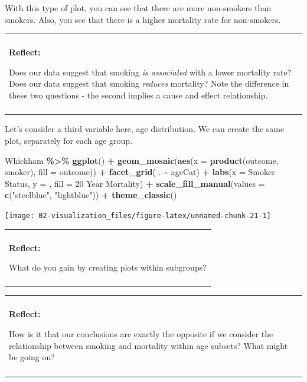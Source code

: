 \documentclass[
]{book}
\newenvironment{Shaded}{\begin{snugshade}}{\end{snugshade}}
\newcommand{\AttributeTok}[1]{\textcolor[rgb]{0.13,0.29,0.53}{#1}}
\newcommand{\FunctionTok}[1]{\textcolor[rgb]{0.13,0.29,0.53}{\textbf{#1}}}
\newcommand{\NormalTok}[1]{#1}
\newcommand{\SpecialCharTok}[1]{\textcolor[rgb]{0.81,0.36,0.00}{\textbf{#1}}}
\newcommand{\StringTok}[1]{\textcolor[rgb]{0.31,0.60,0.02}{#1}}
\newenvironment{reflect}
{
    \begin{center}
    
    \begin{tabular}{|p{0.8\textwidth}|}
    \rowcolor{LightBlue}
    \hline\\
    \rowcolor{LightBlue}
    \textbf{Reflect:}
}
{
    \\\rowcolor{LightBlue}
    \\\hline
    \end{tabular} 
    \end{center}
}
\begin{document}
With this type of plot, you can see that there are more non-smokers than smokers. Also, you see that there is a higher mortality rate for non-smokers.

\begin{reflect}
Does our data suggest that smoking \emph{is associated} with a lower
mortality rate? Does our data suggest that smoking \emph{reduces}
mortality? Note the difference in these two questions - the second
implies a cause and effect relationship.
\end{reflect}

Let's consider a third variable here, age distribution. We can create the same plot, separately for each age group.

\begin{Shaded}
\begin{Highlighting}[]
\NormalTok{Whickham }\SpecialCharTok{\%\textgreater{}\%}
    \FunctionTok{ggplot}\NormalTok{() }\SpecialCharTok{+}
    \FunctionTok{geom\_mosaic}\NormalTok{(}\FunctionTok{aes}\NormalTok{(}\AttributeTok{x =} \FunctionTok{product}\NormalTok{(outcome, smoker), }\AttributeTok{fill =}\NormalTok{ outcome)) }\SpecialCharTok{+} 
    \FunctionTok{facet\_grid}\NormalTok{( . }\SpecialCharTok{\textasciitilde{}}\NormalTok{ ageCat) }\SpecialCharTok{+} 
    \FunctionTok{labs}\NormalTok{(}\AttributeTok{x =} \StringTok{\textquotesingle{}Smoker Status\textquotesingle{}}\NormalTok{, }\AttributeTok{y =} \StringTok{\textquotesingle{}\textquotesingle{}}\NormalTok{, }\AttributeTok{fill =} \StringTok{\textquotesingle{}20 Year Mortality\textquotesingle{}}\NormalTok{) }\SpecialCharTok{+} 
    \FunctionTok{scale\_fill\_manual}\NormalTok{(}\AttributeTok{values =} \FunctionTok{c}\NormalTok{(}\StringTok{"steelblue"}\NormalTok{, }\StringTok{"lightblue"}\NormalTok{)) }\SpecialCharTok{+} 
    \FunctionTok{theme\_classic}\NormalTok{()}
\end{Highlighting}
\end{Shaded}

\begin{center}\texttt{[image: 02-visualization\_files/figure-latex/unnamed-chunk-21-1]} \end{center}

\begin{reflect}
What do you gain by creating plots within subgroups?
\end{reflect}

\begin{reflect}
How is it that our conclusions are exactly the opposite if we consider
the relationship between smoking and mortality within age subsets? What
might be going on?
\end{reflect}
\end{document}
